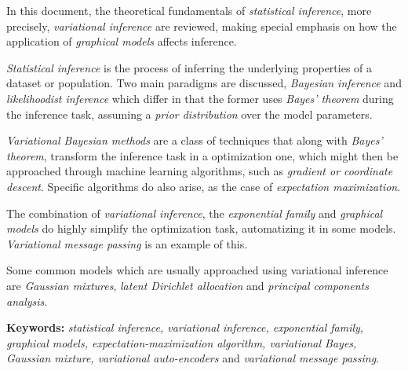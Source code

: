 In this document, the theoretical fundamentals of \emph{statistical inference}, more precisely, \emph{variational inference} are reviewed, making special emphasis on how the application of \emph{graphical models} affects inference.

\emph{Statistical inference} is the process of inferring the underlying properties of a dataset or population. Two main paradigms are discussed, \emph{Bayesian inference} and \emph{likelihoodist inference} which differ in that the former uses \emph{Bayes' theorem} during the inference task, assuming a \emph{prior distribution} over the model parameters.

\emph{Variational Bayesian methods} are a class of techniques that along with \emph{Bayes' theorem}, transform the inference task in a optimization one, which might then be approached through machine learning algorithms, such as \emph{gradient or coordinate descent}. Specific algorithms do also arise, as the case of \emph{expectation maximization}.

The combination of \emph{variational inference}, the \emph{exponential family} and \emph{graphical models} do highly simplify the optimization task, automatizing it in some models. \emph{Variational message passing} is an example of this.

Some common models which are usually approached using variational inference are \emph{Gaussian mixtures}, \emph{latent Dirichlet allocation} and \emph{principal components analysis}.


\textbf{Keywords:} \emph{statistical inference, variational inference, exponential family, graphical models, expectation-maximization algorithm, variational Bayes, Gaussian mixture, variational auto-encoders} and \emph{variational message passing}.
